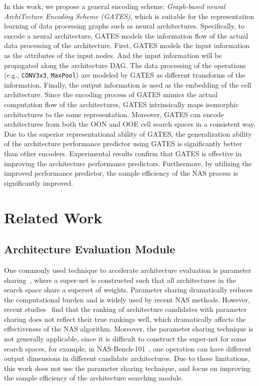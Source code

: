 \documentclass[runningheads]{llncs}
\begin{document}
In this work, we propose a general encoding scheme: \emph{Graph-based neural ArchiTecture Encoding Scheme (GATES)}, which is suitable for the representation learning of data processing graphs such as neural architectures.
Specifically, to encode a neural architecture, GATES models the information flow of the actual data processing of the architecture. First, GATES models the input information as the attributes of the input nodes. And the input information will be propagated along the architecture DAG. The data processing of the operations (e.g., \texttt{CONV3x3}, \texttt{MaxPool}) are modeled by GATES as different transforms of the information. Finally, the output information is used as the embedding of the cell architecture.
Since the encoding process of GATES mimics the actual computation flow of the architectures, GATES intrinsically maps isomorphic architectures to the same representation. Moreover, GATES can encode architectures from both the OON and OOE 
cell search spaces in a consistent way.
Due to the superior representational ability of GATES, the generalization ability of the architecture performance predictor using GATES is significantly better than other encoders.
Experimental results confirm that GATES is effective in improving the architecture performance predictors. Furthermore, by utilizing the improved performance predictor, the sample efficiency of the NAS process is significantly improved.



\section{Related Work}
\label{sec:related_work}

\subsection{Architecture Evaluation Module}


One commonly used technique to accelerate architecture evaluation is parameter sharing~\cite{pham2018efficient}, where a super-net is constructed such that all architectures in the search space share a superset of weights. Parameter sharing dramatically reduces the computational burden and is widely used by recent NAS methods.
However, recent studies~\cite{sciuto2019evaluating,luo2019understanding} find that the ranking of architecture candidates with parameter sharing does not reflect their true rankings well,
which dramatically affects the effectiveness of the NAS algorithm. Moreover, the parameter sharing technique is not generally applicable, 
since it is difficult to construct the super-net for some search spaces, for example, in NAS-Bench-101~\cite{ying2019bench}, 
one operation can have different output dimensions in different candidate architectures.
Due to these limitations, this work does not use the parameter sharing technique, and focus on improving the sample efficiency of the architecture searching module.
\end{document}
